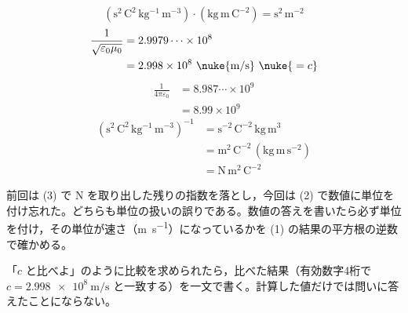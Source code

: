 \[ (\mathrm{s^{2}\,C^{2}\,kg^{-1}\,m^{-3}})\cdot(\mathrm{kg\,m\,C^{-2}})=\mathrm{s^{2}\,m^{-2}} \]
\begin{align*}
\frac{1}{\sqrt{\varepsilon_{0}\mu_{0}}}&=2.9979\cdots\times10^{8}\\
&=2.998\times10^{8}\ \nuke{\mathrm{m/s}}\ \nuke{{}=c}
\end{align*}
\begin{align*}
\frac{1}{4\pi\varepsilon_{0}}&=8.987\cdots\times10^{9}\\
&=8.99\times10^{9}
\end{align*}
\begin{align*}
(\mathrm{s^{2}\,C^{2}\,kg^{-1}\,m^{-3}})^{-1}&=\mathrm{s^{-2}\,C^{-2}\,kg\,m^{3}}\\
&=\mathrm{m^{2}\,C^{-2}}\,(\mathrm{kg\,m\,s^{-2}})\\
&=\mathrm{N\,m^{2}\,C^{-2}}
\end{align*}
\item {} 前回は (3) で \unit{\newton} を取り出した残りの指数を落とし，今回は (2) で数値に単位を付け忘れた。どちらも単位の扱いの誤りである。数値の答えを書いたら必ず単位を付け，その単位が速さ（\unit{\metre\per\second}）になっているかを (1) の結果の平方根の逆数で確かめる。
\item 「$c$ と比べよ」のように比較を求められたら，比べた結果（有効数字4桁で $c=\qty{2.998e8}{\metre\per\second}$ と一致する）を一文で書く。計算した値だけでは問いに答えたことにならない。
